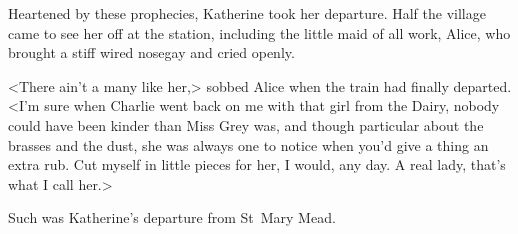 Heartened by these prophecies, Katherine took her departure. Half the village came to see her off at the station, including the little maid of all work, Alice, who brought a stiff wired nosegay and cried openly.

<There ain't a many like her,> sobbed Alice when the train had finally departed. <I'm sure when Charlie went back on me with that girl from the Dairy, nobody could have been kinder than Miss Grey was, and though particular about the brasses and the dust, she was always one to notice when you'd give a thing an extra rub. Cut myself in little pieces for her, I would, any day. A real lady, that's what I call her.>

Such was Katherine's departure from St~Mary Mead.